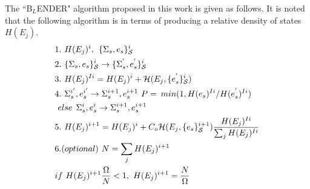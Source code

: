 \documentclass[twocolumn]{article}
\begin{document}
The ``B$_{L}$ENDER" algorithm proposed in this work  is given as follows. It is noted that the following algorithm is in terms of producing a relative density of states $H(E_j)$.  \\
\begin{equation}
\begin{split}
&1.\hspace{0.125cm} H(E_j)^i ,\hspace{0.15cm}  \{\Sigma_{s},e_s\}_{\mathcal{S}}^i\\
&2. \hspace{0.125cm}\{\Sigma_{s},e_s\}_{\mathcal{S}}^i \rightarrow  \{\Sigma_{s}^{'},e_s^{'}\}_{\mathcal{S}}^i\\
&3. \hspace{0.125cm}H(E_j)^{Ii} = H(E_j)^i + \mathcal{H}(E_j, \{e_{s}^{'}\}_{\mathcal{S}}^i) \\
&4. \hspace{0.125cm} \Sigma_{s}^{i'}, e_s^{i'} \rightarrow \Sigma_{s}^{i+1},e_s^{i+1}   \hspace{0.125cm} P = \hspace{0.075cm} min (1, H(e_s)^{Ii}/H(e_s^{'})^{Ii})\\
& \hspace{0.125cm}else  \hspace{0.15cm} \Sigma_{s}^i, e_s^i \rightarrow \Sigma_{s}^{i+1}, e_s^{i+1}\\
&5. \hspace{0.125cm} H(E_j)^{i+1} = H(E_j)^{i} + C_o\mathcal{H}(E_j, \{e_s\}_{\mathcal{S}}^{i+1})\frac{H(E_j)^{Ii}}{\sum_j H(E_j)^{Ii} }\\
&6.(optional) \hspace{0.125cm} N = \sum_j H(E_j)^{i+1} \hspace{0.125cm}\\
& if \hspace{0.125cm} H(E_j)^{i+1}\frac{\Omega}{N}  < 1, \hspace{0.125cm}  H(E_j)^{i+1} =  \frac{N}{\Omega}
\end{split}
\end{equation}
\end{document}
